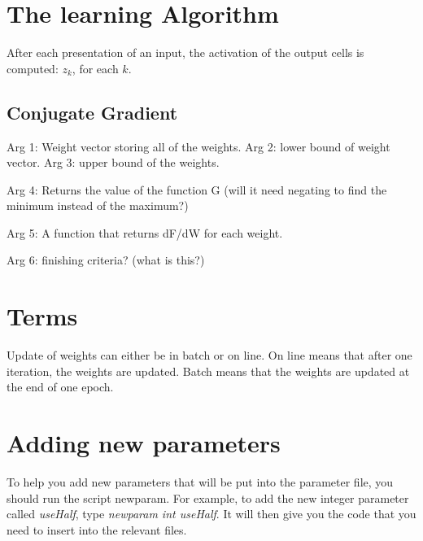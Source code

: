 \documentclass[a4paper]{article}
\begin{document}
\section{The learning Algorithm}

After each presentation of an input, the activation of the output
cells is computed: $z_k$, for each $k$.


\subsection{Conjugate Gradient}





Arg 1: Weight vector storing all of the weights.  Arg 2: lower bound
of weight vector. Arg 3: upper bound of the weights.

Arg 4: Returns the value of the function G (will it need negating to
find the minimum instead of the maximum?)

Arg 5: A function that returns dF/dW for each weight.

Arg 6: finishing criteria? (what is this?)






\section{Terms}

Update of weights can either be in batch or on line.  On line means
that after one iteration, the weights are updated.  Batch means that
the weights are updated at the end of one epoch.


\section{Adding new parameters}
To help you add new parameters that will be put into the parameter
file, you should run the script newparam.  For example, to add the new
integer parameter called {\it useHalf}, type {\it newparam int
  useHalf}.  It will then give you the code that you need to
insert into the relevant files.  





\end{document}
